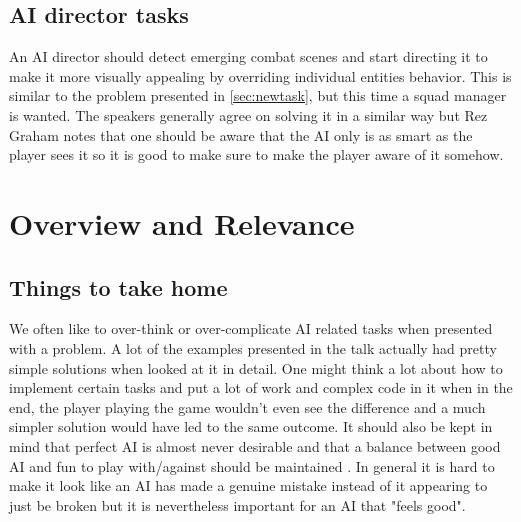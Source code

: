 \documentclass[a4paper]{article}
\begin{document}
\subsection{AI director tasks}
An AI director should detect emerging combat scenes and start directing it to make it more visually appealing by overriding individual entities behavior. This is similar to the problem presented in \ref{sec:newtask}, but this time a squad manager is wanted. The speakers generally agree on solving it in a similar way but Rez Graham notes that one should be aware that the AI only is as smart as the player sees it so it is good to make sure to make the player aware of it somehow.

\section{Overview and Relevance}
\subsection{Things to take home}
We often like to over-think or over-complicate AI related tasks when presented with a problem. A lot of the examples presented in the talk actually had pretty simple solutions when looked at it in detail. One might think a lot about how to implement certain tasks and put a lot of work and complex code in it when in the end, the player playing the game wouldn't even see the difference and a much simpler solution would have led to the same outcome. It should also be kept in mind that perfect AI is almost never desirable and that a balance between good AI and fun to play with/against should be maintained \cite{techradar}. In general it is hard to make it look like an AI has made a genuine mistake instead of it appearing to just be broken but it is nevertheless important for an AI that "feels good".
\end{document}
